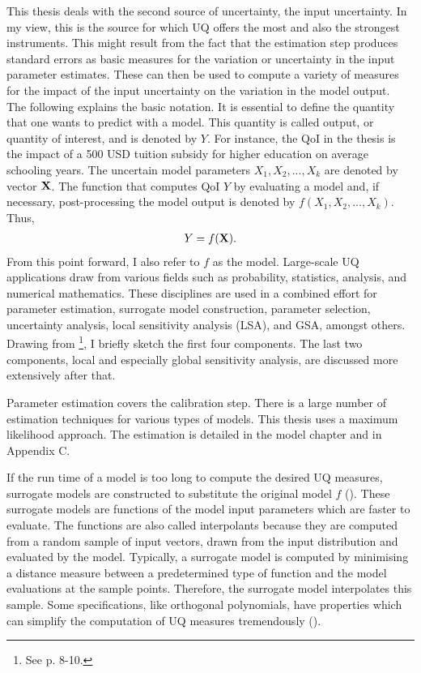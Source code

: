 This thesis deals with the second source of uncertainty, the input uncertainty. In my view, this is the source for which UQ offers the most and also the strongest instruments. This might result from the fact that the estimation step produces standard errors as basic measures for the variation or uncertainty in the input parameter estimates. These can then be used to compute a variety of measures for the impact of the input uncertainty on the variation in the model output.\\
\newline
The following explains the basic notation. It is essential to define the quantity that one wants to predict with a model. This quantity is called output, or quantity of interest, and is denoted by $Y$. For instance, the QoI in the thesis is the impact of a 500 USD tuition subsidy for higher education on average schooling years. The uncertain model parameters $X_1, X_2, ..., X_k$ are denoted by vector $\bold{X}$. The function that computes QoI $Y$ by evaluating a  model and, if necessary, post-processing the model output is denoted by $f(X_1, X_2, ..., X_k)$. Thus,
\begin{align}
Y = f(\bold{X}).
\end{align}
From this point forward, I also refer to $f$ as the model. Large-scale UQ applications draw from various fields such as probability, statistics, analysis, and numerical mathematics. These disciplines are used in a combined effort for parameter estimation, surrogate model construction, parameter selection, uncertainty analysis, local sensitivity analysis (LSA), and GSA, amongst others. Drawing from \cite{Smith.2014}\footnote{See p. 8-10.}, I briefly sketch the first four components. The last two components, local and especially global sensitivity analysis, are discussed more extensively after that.

Parameter estimation covers the calibration step. There is a large number of estimation techniques for various types of models. This thesis uses a maximum likelihood approach. The estimation is detailed in the model chapter and in Appendix C.

If the run time of a model is too long to compute the desired UQ measures, surrogate models are constructed to substitute the original model $f$ (\cite{mcbride2019overview}). These surrogate models are functions of the model input parameters which are faster to evaluate. The functions are also called interpolants because they are computed from a random sample of input vectors, drawn from the input distribution and evaluated by the model. Typically, a surrogate model is computed by minimising a distance measure between a predetermined type of function and the model evaluations at the sample points. Therefore, the surrogate model interpolates this sample. Some specifications, like orthogonal polynomials, have properties which can simplify the computation of UQ measures tremendously (\cite{xiu2010numerical}).

